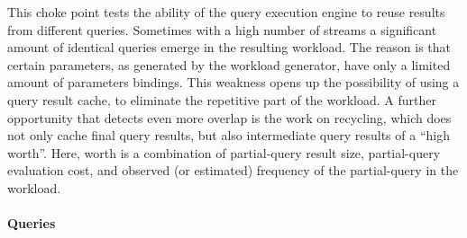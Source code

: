 
This choke point tests the ability of the query execution engine to reuse
results from different queries. Sometimes with a high number of streams a
significant amount of identical queries emerge in the resulting workload. The
reason is that certain parameters, as generated by the workload generator, have
only a limited amount of parameters bindings. This weakness opens up the
possibility of using a query result cache, to eliminate the repetitive part of
the workload. A further opportunity that detects even more overlap is the work
on recycling, which does not only cache final query results, but also
intermediate query results of a ``high worth''. Here, worth is a combination of
partial-query result size, partial-query evaluation cost, and observed (or
estimated) frequency of the partial-query in the workload.


\paragraph{Queries}
{\raggedright
}